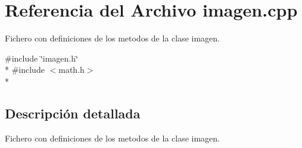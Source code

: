 \section{Referencia del Archivo imagen.\+cpp}
\label{imagen_8cpp}


Fichero con definiciones de los metodos de la clase imagen.  


{\ttfamily \#include \char`\"{}imagen.\+h\char`\"{}}\\*
{\ttfamily \#include $<$math.\+h$>$}\\*


\subsection{Descripción detallada}
Fichero con definiciones de los metodos de la clase imagen. 

